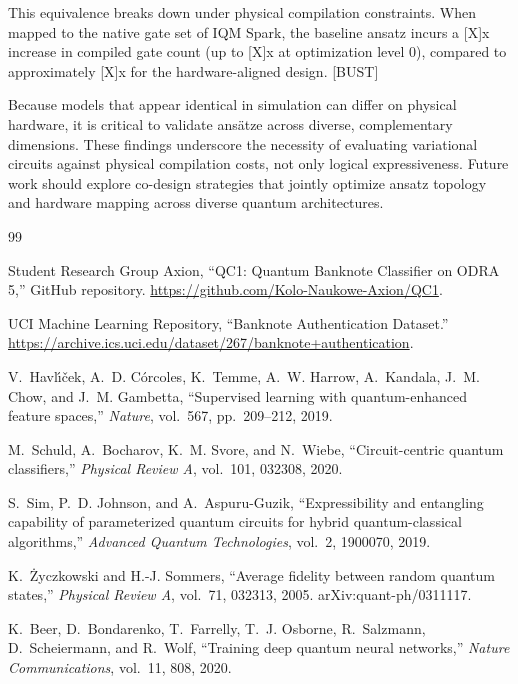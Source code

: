 \documentclass[11pt]{article}
\begin{document}
This equivalence breaks down under physical compilation constraints. When mapped to the native gate set of IQM Spark, the baseline ansatz incurs a [X]x increase in compiled gate count (up to [X]x at optimization level 0), compared to approximately [X]x for the hardware-aligned design. [BUST]

Because models that appear identical in simulation can differ on physical hardware, it is critical to validate ansätze across diverse, complementary dimensions. These findings underscore the necessity of evaluating variational circuits against physical compilation costs, not only logical expressiveness. Future work should explore co-design strategies that jointly optimize ansatz topology and hardware mapping across diverse quantum architectures.

\begin{thebibliography}{99}

Student Research Group Axion,
\newblock ``QC1: Quantum Banknote Classifier on ODRA 5,''
\newblock GitHub repository.
\newblock \url{https://github.com/Kolo-Naukowe-Axion/QC1}.

UCI Machine Learning Repository,
\newblock ``Banknote Authentication Dataset.''
\newblock \url{https://archive.ics.uci.edu/dataset/267/banknote+authentication}.

V.~Havl\'{\i}\v{c}ek, A.~D. C\'orcoles, K.~Temme, A.~W. Harrow, A.~Kandala, J.~M. Chow, and J.~M. Gambetta,
\newblock ``Supervised learning with quantum-enhanced feature spaces,''
\newblock \emph{Nature}, vol.~567, pp.~209--212, 2019.

M.~Schuld, A.~Bocharov, K.~M. Svore, and N.~Wiebe,
\newblock ``Circuit-centric quantum classifiers,''
\newblock \emph{Physical Review A}, vol.~101, 032308, 2020.

S.~Sim, P.~D. Johnson, and A.~Aspuru-Guzik,
\newblock ``Expressibility and entangling capability of parameterized quantum circuits for hybrid quantum-classical algorithms,''
\newblock \emph{Advanced Quantum Technologies}, vol.~2, 1900070, 2019.

K.~\.Zyczkowski and H.-J. Sommers,
\newblock ``Average fidelity between random quantum states,''
\newblock \emph{Physical Review A}, vol.~71, 032313, 2005.
\newblock arXiv:quant-ph/0311117.

K.~Beer, D.~Bondarenko, T.~Farrelly, T.~J. Osborne, R.~Salzmann, D.~Scheiermann, and R.~Wolf,
\newblock ``Training deep quantum neural networks,''
\newblock \emph{Nature Communications}, vol.~11, 808, 2020.


\end{thebibliography}
\end{document}
